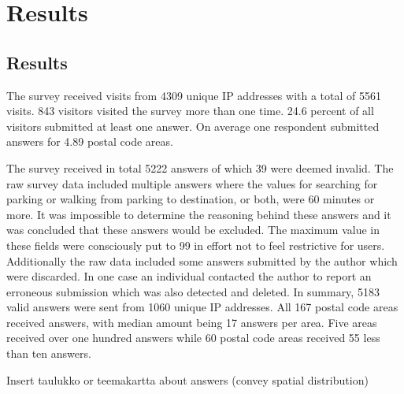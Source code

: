 \section{Results}
\justify

\subsection{Results}
\justify
The survey received visits from 4309 unique IP addresses with a total of 5561 visits. 843 visitors visited the survey more than one time. 24.6 percent of all visitors submitted at least one answer. On average one respondent submitted answers for 4.89 postal code areas.

The survey received in total 5222 answers of which 39 were deemed invalid. The raw survey data included multiple answers where the values for searching for parking or walking from parking to destination, or both, were 60 minutes or more. It was impossible to determine the reasoning behind these answers and it was concluded that these answers would be excluded. The maximum value in these fields were consciously put to 99 in effort not to feel restrictive for users. Additionally the raw data included some answers submitted by the author which were discarded. In one case an individual contacted the author to report an erroneous submission which was also detected and deleted. In summary, 5183 valid answers were sent from 1060 unique IP addresses. All 167 postal code areas received answers, with median amount being 17 answers per area. Five areas received over one hundred answers while 60 postal code areas received 55 less than ten answers. 

Insert taulukko or teemakartta about answers (convey spatial distribution)